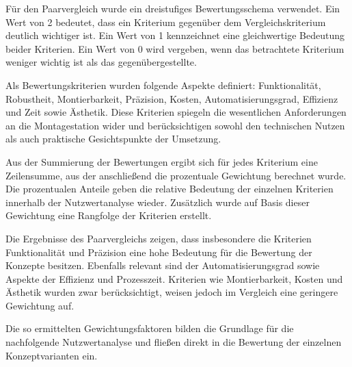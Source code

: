 Für den Paarvergleich wurde ein dreistufiges Bewertungsschema verwendet. Ein Wert von 2 bedeutet, dass ein Kriterium gegenüber dem Vergleichskriterium deutlich wichtiger ist. Ein Wert von 1 kennzeichnet eine gleichwertige Bedeutung beider Kriterien. Ein Wert von 0 wird vergeben, wenn das betrachtete Kriterium weniger wichtig ist als das gegenübergestellte.

Als Bewertungskriterien wurden folgende Aspekte definiert: Funktionalität, Robustheit, Montierbarkeit, Präzision, Kosten, Automatisierungsgrad, Effizienz und Zeit sowie Ästhetik. Diese Kriterien spiegeln die wesentlichen Anforderungen an die Montagestation wider und berücksichtigen sowohl den technischen Nutzen als auch praktische Gesichtspunkte der Umsetzung.

Aus der Summierung der Bewertungen ergibt sich für jedes Kriterium eine Zeilensumme, aus der anschließend die prozentuale Gewichtung berechnet wurde. Die prozentualen Anteile geben die relative Bedeutung der einzelnen Kriterien innerhalb der Nutzwertanalyse wieder. Zusätzlich wurde auf Basis dieser Gewichtung eine Rangfolge der Kriterien erstellt.

Die Ergebnisse des Paarvergleichs zeigen, dass insbesondere die Kriterien Funktionalität und Präzision eine hohe Bedeutung für die Bewertung der Konzepte besitzen. Ebenfalls relevant sind der Automatisierungsgrad sowie Aspekte der Effizienz und Prozesszeit. Kriterien wie Montierbarkeit, Kosten und Ästhetik wurden zwar berücksichtigt, weisen jedoch im Vergleich eine geringere Gewichtung auf.

Die so ermittelten Gewichtungsfaktoren bilden die Grundlage für die nachfolgende Nutzwertanalyse und fließen direkt in die Bewertung der einzelnen Konzeptvarianten ein.

